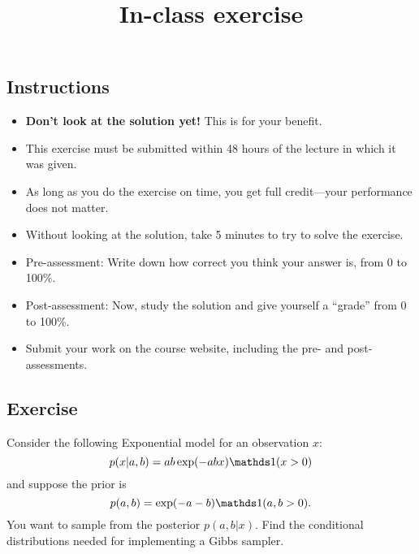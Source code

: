 \documentclass[12pt]{article}
\title{In-class exercise}
\author{}
\date{}
\begin{document}
\maketitle

\subsection*{Instructions}
\begin{itemize}
\item \textbf{Don't look at the solution yet!} This is for your benefit.
\item This exercise must be submitted within 48 hours of the lecture in which it was given. 
\item As long as you do the exercise on time, you get full credit---your performance does not matter.
\item Without looking at the solution, take 5 minutes to try to solve the exercise.
\item Pre-assessment: Write down how correct you think your answer is, from 0 to 100\%.
\item Post-assessment: Now, study the solution and give yourself a ``grade'' from 0 to 100\%.
\item Submit your work on the course website, including the pre- and post- assessments.
\end{itemize}

\subsection*{Exercise}
Consider the following Exponential model for an observation $x$:
$$ p(x|a,b) = a b \exp(- a b x) \I(x>0)$$
and suppose the prior is 
$$ p(a,b) = \exp(- a - b)\I(a,b>0). $$
You want to sample from the posterior $p(a,b|x)$.  Find the conditional distributions needed for implementing a Gibbs sampler.


\newpage
\vfill
{}
\end{document}
